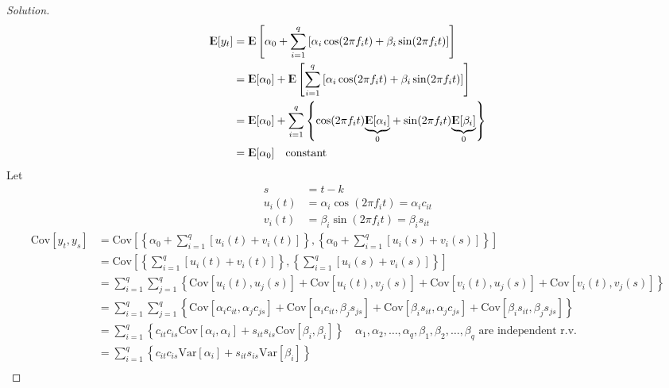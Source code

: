 \documentclass[UTF8,a4paper,14pt]{ctexart}
\newcommand{\E}{{\rm I\kern-.3em E}}
\newcommand{\Var}{\mathrm{Var}}
\newcommand{\Cov}{\mathrm{Cov}}
\newenvironment{solution}
  {\renewcommand\qedsymbol{$\blacksquare$}\begin{proof}[Solution]}
  {\end{proof}}
\theoremstyle{definition}
\theoremstyle{remark}
\begin{document}
\begin{solution}
    \begin{align*}
        \E[y_t] &= \E\left[\alpha_0 + \sum_{i=1}^q \left[\alpha_i \cos(2\pi f_i t) + \beta_i \sin(2\pi f_i t)\right]\right]\\
        &=\E[\alpha_0]+\E\left[\sum_{i=1}^q \left[\alpha_i \cos(2\pi f_i t) + \beta_i \sin(2\pi f_i t)\right]\right]\\
        &=\E[\alpha_0]+\sum_{i=1}^q\left\{\cos(2\pi f_i t)\underset{0}{\underbrace{\E[\alpha_i]}}+\sin(2\pi f_i t)\underset{0}{\underbrace{\E[\beta_i]}}\right\}\\
        &=\E[\alpha_0]\quad\text{constant}
    \end{align*}
    Let 
    \begin{align*}
        s &= t-k\\
        u_i(t) &= \alpha_i \cos(2\pi f_i t) = \alpha_i c_{it}\\
        v_i(t) &= \beta_i \sin(2\pi f_i t) = \beta_i s_{it}
    \end{align*}
    \begin{align*}
        \Cov[y_t,y_s] &=\Cov\left[\left\{\alpha_0 + \sum_{i=1}^q \left[u_i(t) + v_i(t)\right]\right\},\left\{\alpha_0 + \sum_{i=1}^q \left[u_i(s) + v_i(s)\right]\right\}\right]\\
        &=\Cov\left[\left\{ \sum_{i=1}^q \left[u_i(t) + v_i(t)\right]\right\},\left\{\sum_{i=1}^q \left[u_i(s) + v_i(s)\right]\right\}\right]\\
        &=\sum_{i=1}^q \sum_{j=1}^q \left\{\Cov[u_i(t),u_j(s)]+\Cov[u_i(t),v_j(s)]+\Cov[v_i(t),u_j(s)]+\Cov[v_i(t),v_j(s)]\right\}\\
        &=\sum_{i=1}^q \sum_{j=1}^q \left\{\Cov[\alpha_i c_{it},\alpha_j c_{js}]+\Cov[\alpha_i c_{it},\beta_j s_{js}]+\Cov[\beta_i s_{it},\alpha_j c_{js}]+\Cov[\beta_i s_{it},\beta_j s_{js}]\right\}\\
        &=\sum_{i=1}^q  \left\{ c_{it}c_{is}\Cov[\alpha_i,\alpha_i ]+s_{it}s_{is}\Cov[\beta_i ,\beta_i ]\right\}\quad\alpha_1, \alpha_2, \ldots, \alpha_q, \beta_1, \beta_2,\ldots, \beta_q \text{ are independent r.v.}\\
        &=\sum_{i=1}^q  \left\{ c_{it}c_{is}\Var[\alpha_i]+s_{it}s_{is}\Var[\beta_i]\right\}\\

\end{align*}
\end{solution}
\end{document}
